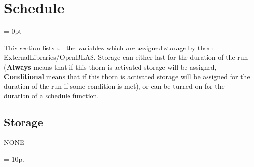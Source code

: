 
\section{Schedule} 


\parskip = 0pt


\noindent This section lists all the variables which are assigned storage by thorn ExternalLibraries/OpenBLAS.  Storage can either last for the duration of the run ({\bf Always} means that if this thorn is activated storage will be assigned, {\bf Conditional} means that if this thorn is activated storage will be assigned for the duration of the run if some condition is met), or can be turned on for the duration of a schedule function.


\subsection*{Storage}NONE

\vspace{5mm}\parskip = 10pt 
